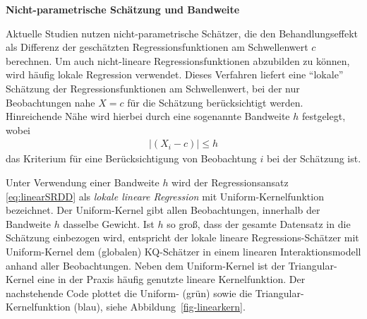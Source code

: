 \documentclass[
  a4paper,
  DIV=11,
  oneside]{scrreprt}
\begin{document}
\textbf{Nicht-parametrische Schätzung und Bandweite}

Aktuelle Studien nutzen nicht-parametrische Schätzer, die den
Behandlungseffekt als Differenz der geschätzten Regressionsfunktionen am
Schwellenwert \(c\) berechnen. Um auch nicht-lineare
Regressionsfunktionen abzubilden zu können, wird häufig lokale
Regression verwendet. Dieses Verfahren liefert eine ``lokale'' Schätzung
der Regressionsfunktionen am Schwellenwert, bei der nur Beobachtungen
nahe \(X = c\) für die Schätzung berücksichtigt werden. Hinreichende
Nähe wird hierbei durch eine sogenannte Bandweite \(h\) festgelegt,
wobei \begin{align}
  \lvert(X_i-c)\rvert\leq h \label{eq:bwc}
\end{align} das Kriterium für eine Berücksichtigung von Beobachtung
\(i\) bei der Schätzung ist.

Unter Verwendung einer Bandweite \(h\) wird der Regressionsansatz
\eqref{eq:linearSRDD} als \emph{lokale lineare Regression} mit
Uniform-Kernelfunktion bezeichnet. Der Uniform-Kernel gibt allen
Beobachtungen, innerhalb der Bandweite \(h\) dasselbe Gewicht. Ist \(h\)
so groß, dass der gesamte Datensatz in die Schätzung einbezogen wird,
entspricht der lokale lineare Regressions-Schätzer mit Uniform-Kernel
dem (globalen) KQ-Schätzer in einem linearen Interaktionsmodell anhand
aller Beobachtungen. Neben dem Uniform-Kernel ist der Triangular-Kernel
eine in der Praxis häufig genutzte lineare Kernelfunktion. Der
nachstehende Code plottet die Uniform- (grün) sowie die
Triangular-Kernelfunktion (blau), siehe Abbildung~\ref{fig-linearkern}.
\end{document}
